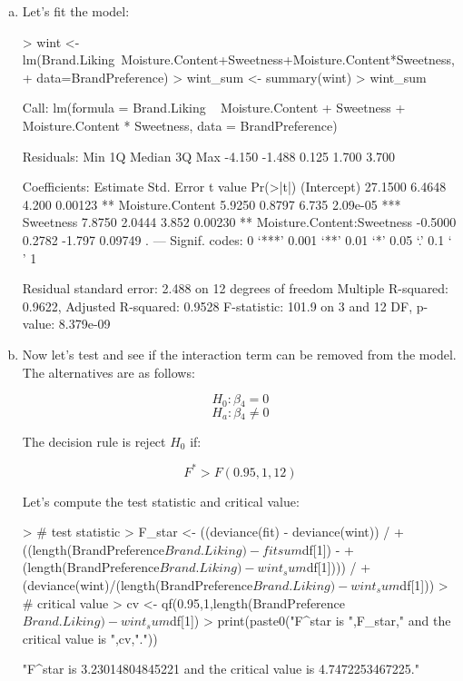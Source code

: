 \documentclass{article}
\begin{document}
\begin{enumerate}[a)]
\item{} Let's fit the model:

\begin{Schunk}
\begin{Sinput}
> wint <- lm(Brand.Liking~Moisture.Content+Sweetness+Moisture.Content*Sweetness,
+            data=BrandPreference)
> wint_sum <- summary(wint)
> wint_sum
\end{Sinput}
\begin{Soutput}
Call:
lm(formula = Brand.Liking ~ Moisture.Content + Sweetness + Moisture.Content * 
    Sweetness, data = BrandPreference)

Residuals:
   Min     1Q Median     3Q    Max 
-4.150 -1.488  0.125  1.700  3.700 

Coefficients:
                           Estimate Std. Error t value Pr(>|t|)    
(Intercept)                 27.1500     6.4648   4.200  0.00123 ** 
Moisture.Content             5.9250     0.8797   6.735 2.09e-05 ***
Sweetness                    7.8750     2.0444   3.852  0.00230 ** 
Moisture.Content:Sweetness  -0.5000     0.2782  -1.797  0.09749 .  
---
Signif. codes:  0 ‘***’ 0.001 ‘**’ 0.01 ‘*’ 0.05 ‘.’ 0.1 ‘ ’ 1

Residual standard error: 2.488 on 12 degrees of freedom
Multiple R-squared:  0.9622,	Adjusted R-squared:  0.9528 
F-statistic: 101.9 on 3 and 12 DF,  p-value: 8.379e-09
\end{Soutput}
\end{Schunk}

\item{} Now let's test and see if the interaction term can be removed from the model. The alternatives are as follows:

$$ H_0: \beta{}_4 = 0 $$
$$ H_a: \beta{}_4 \neq{} 0 $$

The decision rule is reject $H_0$ if:

$$ F^* > F(0.95,1,12) $$

Let's compute the test statistic and critical value:

\begin{Schunk}
\begin{Sinput}
> # test statistic
> F_star <- ((deviance(fit) - deviance(wint)) /
+   ((length(BrandPreference$Brand.Liking) - fitsum$df[1]) - 
+      (length(BrandPreference$Brand.Liking) - wint_sum$df[1]))) /
+   (deviance(wint)/(length(BrandPreference$Brand.Liking) - wint_sum$df[1]))
> # critical value
> cv <- qf(0.95,1,length(BrandPreference$Brand.Liking)-wint_sum$df[1])
> print(paste0("F^star is ",F_star," and the critical value is ",cv,"."))
\end{Sinput}
\begin{Soutput}
[1] "F^star is 3.23014804845221 and the critical value is 4.7472253467225."
\end{Soutput}
\end{Schunk}


\end{enumerate}
\end{document}
